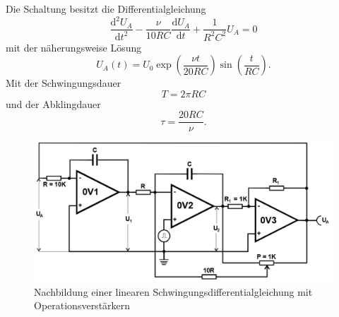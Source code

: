 \noindent Die Schaltung besitzt die Differentialgleichung
\begin{equation}
\frac{\text{d}^2 U_A}{\text{d}t^2} - \frac{\nu}{10RC} \frac{\text{d} U_A}{\text{d}t} + \frac{1}{R^2 C^2} U_A = 0
\end{equation}
mit der näherungsweise Lösung
\begin{equation}
U_A(t) = U_0 \exp\left(\frac{\nu t}{20 RC}\right) \sin\left(\frac{t}{RC}\right) .
\end{equation}
Mit der Schwingungsdauer
\begin{equation}
T = 2\pi RC
\end{equation}
und der Abklingdauer
\begin{equation}
\tau = \frac{20 RC}{\nu} .
\end{equation}

\begin{figure}[h!]
 	\centering
 	\includegraphics[width=\textwidth]{img/sin.png}
 	\caption{Nachbildung einer linearen Schwingungsdifferentialgleichung mit Operationsverstärkern \cite{FP}}
 	\label{abb:sig2}
\end{figure}
